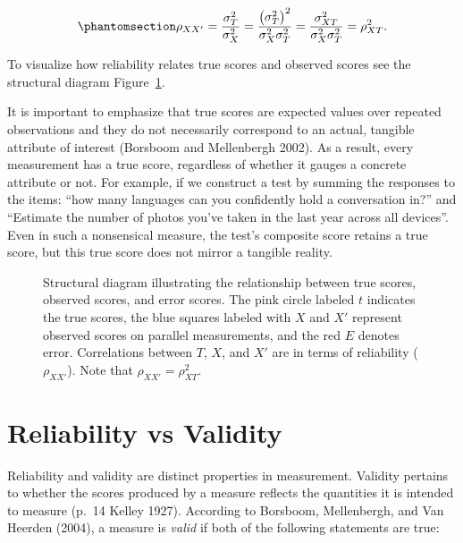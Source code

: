 \documentclass[
  letterpaper,
  DIV=11,
  numbers=noendperiod]{scrreprt}
\begin{document}
\begin{equation}\phantomsection\label{eq-reliability}{
\rho_{XX'} = \frac{\sigma_T^2}{\sigma_X^2} = \frac{\left(\sigma_T^2\right)^2}{\sigma_X^2 \sigma_T^2}= \frac{\sigma_{XT}^2}{\sigma^2_X\sigma^2_T} = \rho^2_{XT}.
}\end{equation}

To visualize how reliability relates true scores and observed scores see
the structural diagram Figure~\ref{fig-rel}.

It is important to emphasize that true scores are expected values over
repeated observations and they do not necessarily correspond to an
actual, tangible attribute of interest (Borsboom and Mellenbergh 2002).
As a result, every measurement has a true score, regardless of whether
it gauges a concrete attribute or not. For example, if we construct a
test by summing the responses to the items: ``how many languages can you
confidently hold a conversation in?'' and ``Estimate the number of
photos you've taken in the last year across all devices''. Even in such
a nonsensical measure, the test's composite score retains a true score,
but this true score does not mirror a tangible reality.

\begin{figure}[H]


\caption{\label{fig-rel}Structural diagram illustrating the relationship
between true scores, observed scores, and error scores. The pink circle
labeled \(t\) indicates the true scores, the blue squares labeled with
\(X\) and \(X'\) represent observed scores on parallel measurements, and
the red \(E\) denotes error. Correlations between \(T\), \(X\), and
\(X'\) are in terms of reliability (\(\rho_{XX'}\)). Note that
\(\rho_{XX'}=\rho_{XT}^2\).}

\end{figure}%

\section{Reliability vs Validity}\label{reliability-vs-validity}

Reliability and validity are distinct properties in measurement.
Validity pertains to whether the scores produced by a measure reflects
the quantities it is intended to measure (p.~14 Kelley 1927). According
to Borsboom, Mellenbergh, and Van Heerden (2004), a measure is
\emph{valid} if both of the following statements are true:
\end{document}
